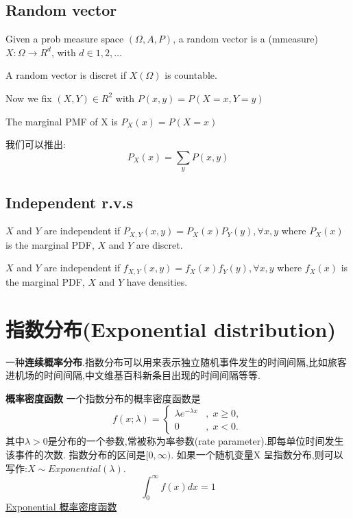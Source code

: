 \documentclass{article}
\begin{document}
\subsection{Random vector}
\begin{definition}
Given a prob measure space $(\Omega, A, P)$, a random vector is a (mmeasure) $X: \Omega \rightarrow R^d$, with $d \in {1, 2, \ldots}$
\end{definition}

\begin{definition}
A random vector is discret if $X(\Omega)$ is countable.
\end{definition}

Now we fix $(X,Y) \in R^2$ with $P(x,y) = P(X=x, Y=y)$
\begin{definition}
The marginal PMF of X is $P_X(x) = P(X = x)$
\end{definition}
我们可以推出: $$P_X(x) = \sum_{y} P(x,y)$$

\subsection{Independent r.v.s}
\begin{definition}
$X$ and $Y$ are independent if $P_{X,Y}(x,y) = P_X(x)P_Y(y), \forall x, y$ where $P_X(x)$ is the marginal PDF, $X$ and $Y$ are discret.
\end{definition}

\begin{definition}
$X$ and $Y$ are independent if $f_{X,Y}(x,y) = f_X(x)f_Y(y), \forall x, y$ where $f_X(x)$ is the marginal PDF, $X$ and $Y$ have densities.
\end{definition}

\section{指数分布(Exponential distribution)}
\label{sec.distribution.exponential}
一种\textbf{连续概率分布}.指数分布可以用来表示独立随机事件发生的时间间隔,比如旅客进机场的时间间隔,中文维基百科新条目出现的时间间隔等等.

\textbf{概率密度函数}
一个指数分布的概率密度函数是
$$f(x;\lambda )=\left\{{\begin{matrix}\lambda e^{{-\lambda x}}&,\;x\geq 0,\\0&,\;x<0.\end{matrix}}\right.$$
其中$\lambda  > 0$是分布的一个参数,常被称为率参数(rate parameter).即每单位时间发生该事件的次数.
指数分布的区间是$[0,\infty)$. 如果一个随机变量X 呈指数分布,则可以写作:$X \sim Exponential(\lambda )$.
$$
\int_0^{\infty} f(x)dx = 1
$$
\href{http://upload.wikimedia.org/wikipedia/commons/thumb/b/b1/Exponential\_distribution\_pdf.png/800px-Exponential\_distribution\_pdf.png}{Exponential 概率密度函数}
	
\end{document}
